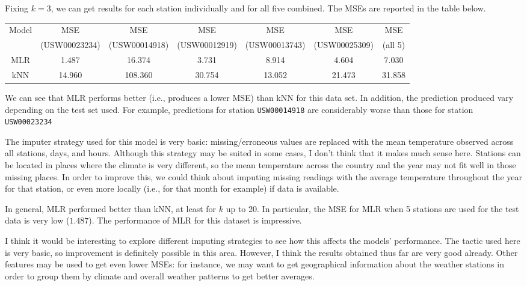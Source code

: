 \documentclass[]{article}
\begin{document}
Fixing $k=3$, we can get results for each station individually and for all five combined. The MSEs are reported in the table below.

\begin{center}
\begin{tabular}{c|c|c|c|c|c|c}
\multirow{2}{*}{Model} & MSE & MSE & MSE & MSE & MSE & MSE\\
& (USW00023234) & (USW00014918) & (USW00012919) & (USW00013743) & (USW00025309) & (all 5)\\
\hline
MLR & 1.487 & 16.374 & 3.731 & 8.914 & 4.604 & 7.030 \\
kNN & 14.960 & 108.360 & 30.754 & 13.052 & 21.473 & 31.858 \\
\end{tabular}
\end{center}

We can see that MLR performs better (i.e., produces a lower MSE) than kNN for this data set. In addition, the prediction produced vary depending on the test set used. For example, predictions for station \texttt{USW00014918} are considerably worse than those for station \texttt{USW00023234}

The imputer strategy used for this model is very basic: missing/erroneous values are replaced with the mean temperature observed across all stations, days, and hours. Although this strategy may be suited in some cases, I don't think that it makes much sense here. Stations can be located in places where the climate is very different, so the mean temperature across the country and the year may not fit well in those missing places. In order to improve this, we could think about imputing missing readings with the average temperature throughout the year for that station, or even more locally (i.e., for that month for example) if data is available.

In general, MLR performed better than kNN, at least for $k$ up to 20. In particular, the MSE for MLR when 5 stations are used for the test data is very low ($1.487$). The performance of MLR for this dataset is impressive.

I think it would be interesting to explore different imputing strategies to see how this affects the models' performance. The tactic used here is very basic, so improvement is definitely possible in this area. However, I think the results obtained thus far are very good already. Other features may be used to get even lower MSEs: for instance, we may want to get geographical information about the weather stations in order to group them by climate and overall weather patterns to get better averages.
\end{document}
